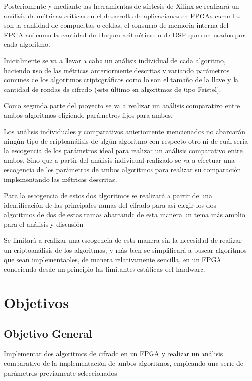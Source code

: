 Posteriomente y mediante las herramientas de síntesis de Xilinx se realizará un análisis de métricas críticas en el desarrollo de aplicaciones en FPGAs como los son la cantidad de compuertas o celdas, el consumo de memoria interna del FPGA así como la cantidad de bloques aritméticos o de DSP que son usados por cada algoritmo. 

Inicialmente se va a llevar a cabo un análisis individual de cada algoritmo, haciendo uso de las métricas anteriormente descritas y variando parámetros comunes de los algoritmos criptográficos como lo son el tamaño de la llave y la cantidad de rondas de cifrado (este último en algoritmos de tipo Feistel). 

Como segunda parte del proyecto se va a realizar un análisis comparativo entre ambos algoritmos eligiendo parámetros fijos para ambos.

Los análisis individuales y comparativos anteriomente mencionados no abarcarán ningún tipo de criptoanálisis de algún algoritmo con respecto otro ni de cuál sería la escogencia de los parámetros ideal para realizar un análisis comparativo entre ambos. Sino que a partir del análisis individual realizado se va a efectuar una escogencia de los parámetros de ambos algoritmos para realizar su comparación implementando las métricas descritas.

Para la escogencia de estos dos algoritmos se realizará a partir de una identificación de las principales ramas del cifrado para así elegir los dos algoritmos de dos de estas ramas abarcando de esta manera un tema más amplio para el análisis y discusión.

Se limitará a realizar una escogencia de esta manera sin la necesidad de realizar un criptoanálisis de los algoritmos, y más bien se simplificará a buscar algoritmos que sean implementables, de manera relativamente sencilla, en un FPGA conociendo desde un principio las limitantes estáticas del hardware.


\section{Objetivos}

\subsection{Objetivo General}

Implementar dos algoritmos de cifrado en un FPGA y realizar un análisis comparativo de la implementación de ambos algoritmos, empleando una serie de parámetros previamente seleccionados.


